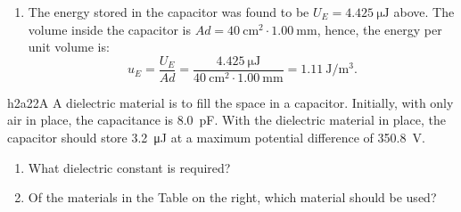 {\begin{derivation}
\begin{enumerate}[label=(\alph*)]
\begin{equation*}
        V = Ed \implies E = \frac{V}{d} = \frac{\qty{500}{\V} }{\qty{1,0}{\mm} } = \qty{500e3}{\N\per\C} 
      .\end{equation*}
    \item The energy stored in the capacitor was found to be $U_E = \qty{4,425}{\micro\J}$ above.
      The volume inside the capacitor is $Ad = \qty{40}{\cm^2} \cdot \qty{1,00}{\mm}$, hence, the energy per unit volume is:
      \begin{equation*}
        u_E = \frac{U_E}{Ad} = \frac{\qty{4,425}{\micro\J}}{\qty{40}{\cm^2} \cdot \qty{1,00}{\mm} } = \qty{1,11}{\J\per\m^3} 
      .\end{equation*}
  \end{enumerate}
  \end{derivation}
  }


  \begin{problemwithimage}{h2a2}{2A}
    A dielectric material is to fill the space in a capacitor.
    Initially, with only air in place, the capacitance is \qty{8,0}{\pico\F}.
    With the dielectric material in place, the capacitor should store \qty{3,2}{\micro\J} at a maximum potential difference of \qty{350,8}{\V}.
    \begin{enumerate}[label=(\alph*)]
      \item What dielectric constant is required?
      \item Of the materials in the Table on the right, which material should be used?
    \end{enumerate}
  \end{problemwithimage}

